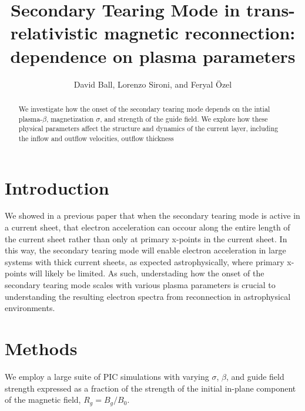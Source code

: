 \documentclass[iop,twocolappendix]{emulateapj}
\begin{document}
\title{Secondary Tearing Mode in trans-relativistic magnetic reconnection: dependence on plasma parameters}

\author{David Ball, Lorenzo Sironi, and Feryal \"Ozel}




\begin{abstract}
	We investigate how the onset of the secondary tearing mode depends on the intial plasma-$\beta$, magnetization $\sigma$, and strength of the guide field.  We explore how these physical parameters affect the structure and dynamics of the current layer, including the inflow and outflow velocities, outflow thickness
\end{abstract}

\maketitle


\section{Introduction}
We showed in a previous paper that when the secondary tearing mode is active in a current sheet, that electron acceleration can occour along the entire length of the current sheet rather than only at primary x-points in the current sheet.  In this way, the secondary tearing mode will enable electron acceleration in large systems with thick current sheets, as expected astrophysically, where primary x-points will likely be limited.  As such, understading how the onset of the secondary tearing mode scales with various plasma parameters is crucial to understanding the resulting electron spectra from reconnection in astrophysical environments.  


\section{Methods}
We employ a large suite of PIC simulations with varying $\sigma$, $\beta$, and guide field strength expressed as a fraction of the strength of the initial in-plane component of the magnetic field, $R_{g}=B_{g}/B_{0}$.  
\end{document}

